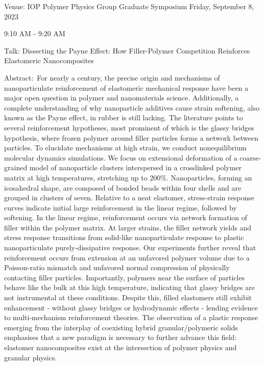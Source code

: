 Venue: IOP Polymer Physics Group Graduate Symposium Friday, September 8, 2023 

9:10 AM - 9:20 AM 

Talk: Dissecting the Payne Effect: How Filler-Polymer Competition Reinforces Elastomeric Nanocomposites 

Abstract: For nearly a century, the precise origin and mechanisms of nanoparticulate reinforcement of elastomeric mechanical response have been a major open question in polymer and nanomaterials science. Additionally, a complete understanding of why nanoparticle additives cause strain softening, also known as the Payne effect, in rubber is still lacking. The literature points to several reinforcement hypotheses, most prominent of which is the glassy bridges hypothesis, where frozen polymer around filler particles forms a network between particles. To elucidate mechanisms at high strain, we conduct nonequilibrium molecular dynamics simulations. We focus on extensional deformation of a coarse-grained model of nanoparticle clusters interspersed in a crosslinked polymer matrix at high temperatures, stretching up to 200\%. Nanoparticles, forming an icosahedral shape, are composed of bonded beads within four shells and are grouped in clusters of seven. Relative to a neat elastomer, stress-strain response curves indicate initial large reinforcement in the linear regime, followed by softening. In the linear regime, reinforcement occurs via network formation of filler within the polymer matrix. At larger strains, the filler network yields and stress response transitions from solid‐like nanoparticulate response to plastic nanoparticulate purely-dissipative response. Our experiments further reveal that reinforcement occurs from extension at an unfavored polymer volume due to a Poisson-ratio mismatch and unfavored normal compression of physically contacting filler particles. Importantly, polymers near the surface of particles behave like the bulk at this high temperature, indicating that glassy bridges are not instrumental at these conditions. Despite this, filled elastomers still exhibit enhancement - without glassy bridges or hydrodynamic effects - lending evidence to multi-mechanism reinforcement theories. The observation of a plastic response emerging from the interplay of coexisting hybrid granular/polymeric solids emphasises that a new paradigm is necessary to further advance this field: elastomer nanocomposites exist at the intersection of polymer physics and granular physics. 
